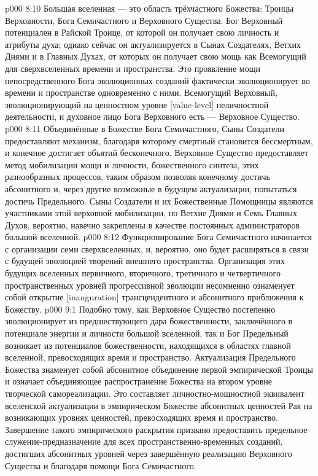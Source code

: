 \vs p000 8:10 \pc Большая вселенная --- это область трёхчастного Божества: Троицы Верховности, Бога Семичастного и Верховного Существа. Бог Верховный потенциален в Райской Троице, от которой он получает свою личность и атрибуты духа; однако сейчас он актуализируется в Сынах Создателях, Ветхих Днями и в Главных Духах, от которых он получает свою мощь как Всемогущий для сверхвселенных времени и пространства. Это проявление мощи непосредственного Бога эволюционных созданий фактически эволюционирует во времени и пространстве одновременно с ними. Всемогущий Верховный, эволюционирующий на ценностном уровне [value\hyp{}level] неличностной деятельности, и духовное лицо Бога Верховного есть  --- Верховное Существо.
\vs p000 8:11 Объединённые в Божестве Бога Семичастного, Сыны Создатели предоставляют механизм, благодаря которому смертный становится бессмертным, и конечное достигает объятий бесконечного. Верховное Существо предоставляет метод мобилизации мощи и личности, божественного синтеза,  этих разнообразных процессов, таким образом позволяя конечному достичь абсонитного и, через другие возможные в будущем актуализации, попытаться достичь Предельного. Сыны Создатели и их Божественные Помощницы являются участниками этой верховной мобилизации, но Ветхие Днями и Семь Главных Духов, вероятно, навечно закреплены в качестве постоянных администраторов большой вселенной.
\vs p000 8:12 Функционирование Бога Семичастного начинается с организации семи сверхвселенных, и, вероятно, оно будет расширяться в связи с будущей эволюцией творений внешнего пространства. Организация этих будущих вселенных первичного, вторичного, третичного и четвертичного пространственных уровней прогрессивной эволюции несомненно ознаменует собой открытие [inauguration] трансцендентного и абсонитного приближения к Божеству.
\vs p000 9:1 Подобно тому, как Верховное Существо постепенно эволюционирует из предшествующего дара божественности, заключённого в потенциале энергии и личности большой вселенной, так и Бог Предельный возникает из потенциалов божественности, находящихся в областях главной вселенной, превосходящих время и пространство. Актуализация Предельного Божества знаменует собой абсонитное объединение первой эмпирической Троицы и означает объединяющее распространение Божества на втором уровне творческой самореализации. Это составляет личностно\hyp{}мощностной эквивалент вселенской актуализации в эмпирическом Божестве абсонитных ценностей Рая на возникающих уровнях ценностей, превосходящих время и пространство. Завершение такого эмпирического раскрытия призвано предоставить предельное служение\hyp{}предназначение для всех пространственно\hyp{}временн\'ых созданий, достигших абсонитных уровней через завершённую реализацию Верховного Существа и благодаря помощи Бога Семичастного.
